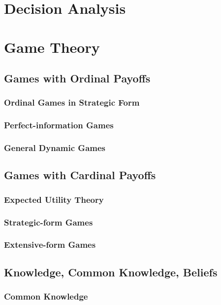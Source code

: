 \part{Decision Analysis}

\part{Game Theory}
	\chapter{Games with Ordinal Payoffs}
		\section{Ordinal Games in Strategic Form}

		\section{Perfect-information Games}

		\section{General Dynamic Games}

	\chapter{Games with Cardinal Payoffs}
		\section{Expected Utility Theory}

		\section{Strategic-form Games}

		\section{Extensive-form Games}

	\chapter{Knowledge, Common Knowledge, Beliefs}
		\section{Common Knowledge}

